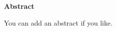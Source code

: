 \thispagestyle{empty}

\centerline{\Large{\textbf{Abstract}}}

\vspace{2cm}

\noindent You can add an abstract if you like.

\newpage
\thispagestyle{empty}
\rule{0cm}{5cm}